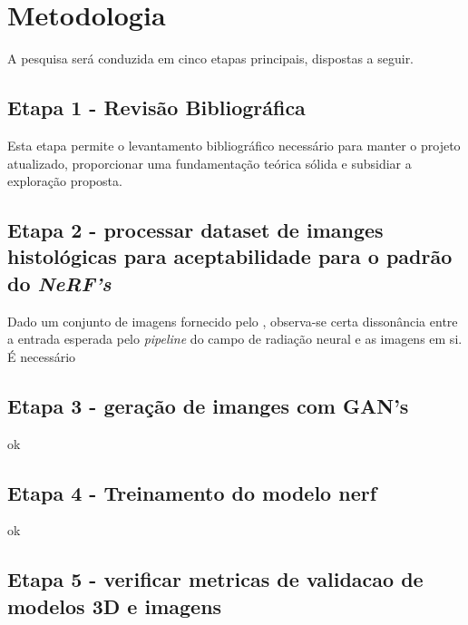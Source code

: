 \section{Metodologia}

A pesquisa será conduzida em cinco etapas principais, dispostas a seguir.


\subsection{Etapa 1 - Revisão Bibliográfica}

Esta etapa permite o levantamento bibliográfico necessário para manter o projeto atualizado, proporcionar uma fundamentação teórica sólida e subsidiar a exploração proposta.



\subsection{Etapa 2 - processar dataset de imanges histológicas para aceptabilidade para o padrão do \textit{NeRF's}}

  Dado um conjunto de imagens fornecido pelo %
  , observa-se certa dissonância entre a entrada esperada pelo \textit{pipeline} do campo de radiação neural e as imagens em si. É necessário %

\subsection{Etapa 3 - geração de imanges com GAN's}

ok

\subsection{Etapa 4 - Treinamento do modelo nerf}

ok 

\subsection{Etapa 5 - verificar metricas de validacao de modelos 3D e imagens}

